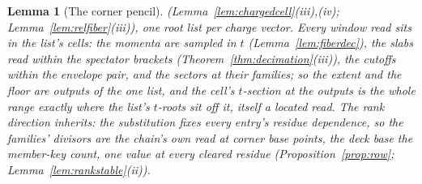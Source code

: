 \documentclass[11pt]{article}
\newtheorem{lemma}{Lemma}
\theoremstyle{definition}
\begin{document}
\begin{lemma}[The corner pencil]
(Lemma~\ref{lem:chargedcell}(iii),(iv);
Lemma~\ref{lem:relfiber}(iii)), one root list per charge vector.
Every window read sits in the list's cells: the momenta are
sampled in $t$ (Lemma~\ref{lem:fiberdec}), the slabs read within
the spectator brackets (Theorem~\ref{thm:decimation}(iii)), the cutoffs
within the envelope pair, and the sectors at their families; so
the extent and the floor are outputs of the one list, and the
cell's $t$-section at the outputs is the whole range exactly where
the list's $t$-roots sit off it, itself a located read. The rank
direction inherits: the substitution fixes every entry's residue
dependence, so the families' divisors are the chain's own read at
corner base points, the deck base the member-key count, one value at every cleared
residue (Proposition~\ref{prop:row};
Lemma~\ref{lem:rankstable}(ii)).


\end{lemma}
\end{document}
